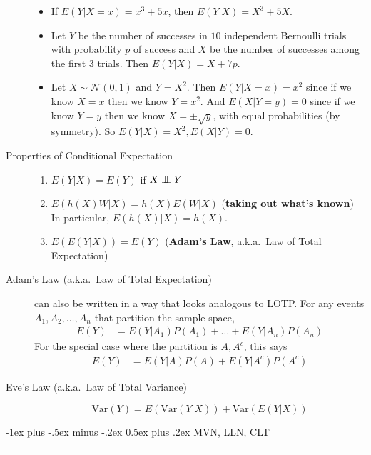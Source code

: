 \documentclass[6pt,landscape]{article}
\makeatletter
\newcommand\independent{\protect\mathpalette{\protect\independenT}{\perp}}
\def\independenT#1#2{\mathrel{\setbox0\hbox{$#1#2$}%
    \copy0\kern-\wd0\mkern4mu\box0}}
\newcommand{\var}{\textrm{Var}}
\renewcommand{\N}{\mathcal{N}}
\renewcommand{\section}{\@startsection{section}{1}{0mm}%
                                {-1ex plus -.5ex minus -.2ex}%
                                {0.5ex plus .2ex}%
                                {\normalfont\large\bfseries}}
\makeatother
\begin{document}
\begin{multicols*}{3}
\begin{description}
    \begin{itemize}
    \item If $E(Y|X=x) = x^3+5x$, then $E(Y|X) = X^3 + 5X$.
    \item Let $Y$ be the number of successes in $10$ independent Bernoulli trials with probability $p$ of success and $X$ be the number of successes among the first $3$ trials. Then $E(Y|X)=X+7p$.
    \item Let $X \sim \N(0,1)$ and $Y=X^2$. Then $E(Y|X=x) = x^2$ since if we know $X=x$ then we know $Y=x^2$. And $E(X|Y=y) = 0$ since if we know $Y=y$ then we know $X = \pm \sqrt{y}$, with equal probabilities (by symmetry). So $E(Y|X)=X^2, E(X|Y)=0$.  
    \end{itemize} 
    
        \item[Properties of Conditional Expectation] \quad
    \begin{enumerate}
        \item $E(Y|X) = E(Y)$ if $X \independent Y$
        \item $E(h(X)W|X) = h(X)E(W|X)$ (\textbf{taking out what's known}) \\
        In particular, $E(h(X)|X) = h(X)$.
        \item $E(E(Y|X)) = E(Y)$ (\textbf{Adam's Law}, a.k.a.~Law of Total Expectation)
    \end{enumerate}

    \item[Adam's Law (a.k.a.~Law of Total Expectation)]  can also be written in a way that looks analogous to LOTP. For any events $A_1, A_2, \dots, A_n$ that partition the sample space, 
        \begin{align*}
        E(Y) &= E(Y|A_1)P(A_1) + \dots + E(Y|A_n)P(A_n)
    \end{align*}
    For the special case where the partition is $A, A^c$, this says
        \begin{align*}
            E(Y) &= E(Y|A)P(A) + E(Y|A^c)P(A^c)
    \end{align*}

    \item[Eve's Law (a.k.a.~Law of Total Variance)] \quad
    \[\var(Y) = E(\var(Y|X)) + \var(E(Y|X))\]
\end{description}


\section{MVN, LLN, CLT}\smallskip \hrule height 2pt \smallskip


\end{multicols*}
\end{document}
